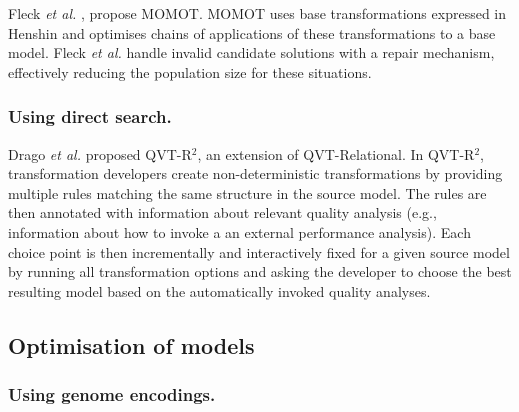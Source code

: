 			Fleck \emph{et al.} \cite{Fleck+15}, propose MOMOT. MOMOT uses base transformations expressed in Henshin and optimises chains of applications of these
			transformations to a base model. Fleck \emph{et al.} handle invalid candidate solutions with a repair mechanism, effectively reducing the population size
			for these situations.
		
		\subsubsection{Using direct search.}
		
			Drago \emph{et al.} \cite{Drago+10,Drago+11,Drago+15} proposed QVT-R$^2$, an extension of QVT-Relational. In QVT-R$^2$, transformation developers create 
			non-deterministic transformations by providing multiple rules matching the same structure in the source model. The rules are then annotated with information
			about relevant quality analysis (e.g., information about how to invoke a an external performance analysis). Each choice point is then incrementally and
			interactively fixed for a given source model by running all transformation options and asking the developer to choose the best resulting model based on the
			automatically invoked quality analyses.

	\subsection{Optimisation of models}
	
	  \subsubsection{Using genome encodings.}
		
			
